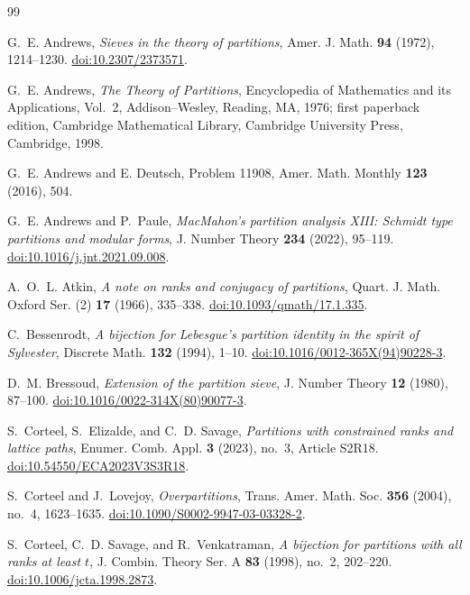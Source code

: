 \documentclass[11pt]{article}
\theoremstyle{definition}
\theoremstyle{remark}
\begin{document}
\begin{thebibliography}{99}

G.~E. Andrews,
\emph{Sieves in the theory of partitions},
Amer. J. Math. \textbf{94} (1972), 1214--1230.
\href{https://doi.org/10.2307/2373571}{doi:10.2307/2373571}.

G.~E. Andrews,
\emph{The Theory of Partitions},
Encyclopedia of Mathematics and its Applications, Vol.~2,
Addison--Wesley, Reading, MA, 1976;
first paperback edition, Cambridge Mathematical Library,
Cambridge University Press, Cambridge, 1998.

G.~E. Andrews and E. Deutsch,
Problem 11908,
Amer. Math. Monthly \textbf{123} (2016), 504.

G.~E. Andrews and P.~Paule,
\emph{MacMahon's partition analysis XIII: Schmidt type partitions and modular forms},
J. Number Theory \textbf{234} (2022), 95--119.
\href{https://doi.org/10.1016/j.jnt.2021.09.008}{doi:10.1016/j.jnt.2021.09.008}.

A.~O.~L. Atkin,
\emph{A note on ranks and conjugacy of partitions},
Quart. J. Math. Oxford Ser. (2) \textbf{17} (1966), 335--338.
\href{https://doi.org/10.1093/qmath/17.1.335}{doi:10.1093/qmath/17.1.335}.

C.~Bessenrodt,
\emph{A bijection for Lebesgue's partition identity in the spirit of Sylvester},
Discrete Math. \textbf{132} (1994), 1--10.
\href{https://doi.org/10.1016/0012-365X(94)90228-3}{doi:10.1016/0012-365X(94)90228-3}.

D.~M. Bressoud,
\emph{Extension of the partition sieve},
J. Number Theory \textbf{12} (1980), 87--100.
\href{https://doi.org/10.1016/0022-314X(80)90077-3}{doi:10.1016/0022-314X(80)90077-3}.

S.~Corteel, S.~Elizalde, and C.~D. Savage,
\emph{Partitions with constrained ranks and lattice paths},
Enumer. Comb. Appl. \textbf{3} (2023), no.~3, Article S2R18.
\href{https://doi.org/10.54550/ECA2023V3S3R18}{doi:10.54550/ECA2023V3S3R18}.

S.~Corteel and J.~Lovejoy,
\emph{Overpartitions},
Trans. Amer. Math. Soc. \textbf{356} (2004), no.~4, 1623--1635.
\href{https://doi.org/10.1090/S0002-9947-03-03328-2}{doi:10.1090/S0002-9947-03-03328-2}.

S.~Corteel, C.~D. Savage, and R.~Venkatraman,
\emph{A bijection for partitions with all ranks at least $t$},
J. Combin. Theory Ser. A \textbf{83} (1998), no.~2, 202--220.
\href{https://doi.org/10.1006/jcta.1998.2873}{doi:10.1006/jcta.1998.2873}.


\end{thebibliography}
\end{document}
